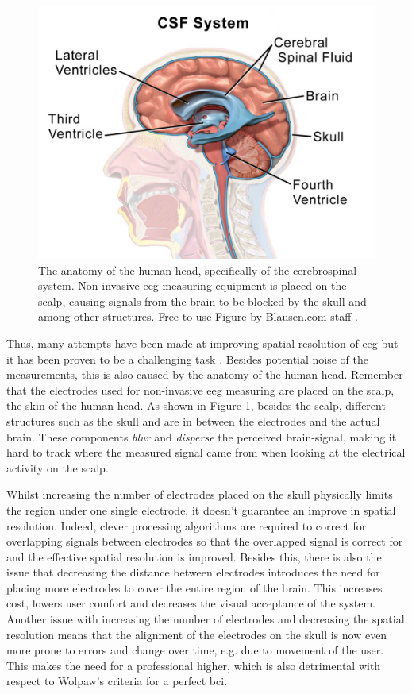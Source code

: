 \begin{figure}[ht]
    \centering
    \includegraphics[width=0.7\linewidth]{../images/introduction/brain_anatomy.pdf}
    \captionsetup{width=0.7\linewidth}
    \captionsetup{justification=centering}
    \caption{The anatomy of the human head, specifically of the cerebrospinal system. Non-invasive \gls{eeg} measuring equipment is placed on the scalp, causing signals from the brain to be blocked by the skull and  among other structures. Free to use Figure by Blausen.com staff \citep{figure_blausen}.}
    \label{fig:brain_anatomy}
\end{figure}

Thus, many attempts have been made at improving spatial resolution of \gls{eeg} but it has been proven to be a challenging task \citep{spatial_resolution}.
Besides potential noise of the measurements, this is also caused by the anatomy of the human head.
Remember that the electrodes used for non-invasive \gls{eeg} measuring are placed on the scalp, the skin of the human head.
As shown in Figure \ref{fig:brain_anatomy}, besides the scalp, different structures such as the skull and  are in between the electrodes and the actual brain.
These components \textit{blur} and \textit{disperse} the perceived brain-signal, making it hard to track where the measured signal came from when looking at the electrical activity on the scalp.

Whilst increasing the number of electrodes placed on the skull physically limits the region under one single electrode, it doesn't guarantee an improve in spatial resolution.
Indeed, clever processing algorithms are required to correct for overlapping signals between electrodes so that the overlapped signal is correct for and the effective spatial resolution is improved.
Besides this, there is also the issue that decreasing the distance between electrodes introduces the need for placing more electrodes to cover the entire region of the brain.
This increases cost, lowers user comfort and decreases the visual acceptance of the system.
Another issue with increasing the number of electrodes and decreasing the spatial resolution means that the alignment of the electrodes on the skull is now even more prone to errors and change over time, e.g. due to movement of the user.
This makes the need for a professional higher, which is also detrimental with respect to Wolpaw's criteria for a perfect \gls{bci}.

